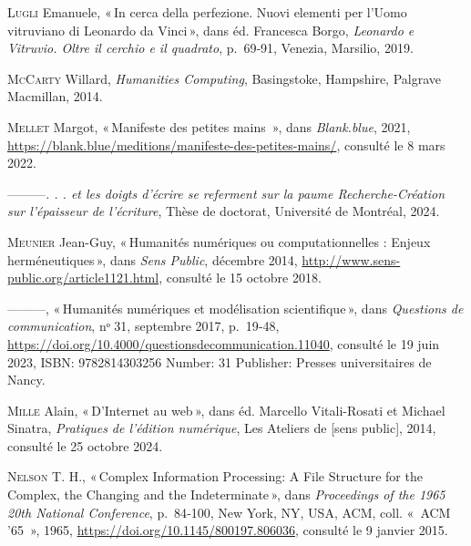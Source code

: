 \begin{CSLReferences}{1}{0}
\leavevmode{}%
\textsc{Lugli} Emanuele, {«\,In cerca della perfezione. {Nuovi} elementi
per l'{Uomo} vitruviano di {Leonardo} da {Vinci}\,»}, dans éd. Francesca
Borgo, \emph{Leonardo e {Vitruvio}. {Oltre} il cerchio e il quadrato},
p.~69‑91, Venezia, Marsilio, 2019.

\leavevmode{}%
\textsc{McCarty} Willard, \emph{Humanities {Computing}}, Basingstoke,
Hampshire, Palgrave Macmillan, 2014.

\leavevmode{}%
\textsc{Mellet} Margot, {«\,Manifeste des petites mains {\textbar}\,»},
dans \emph{Blank.blue}, 2021,
\url{https://blank.blue/meditions/manifeste-des-petites-mains/},
consulté le 8 mars 2022.

\leavevmode{}%
---------\emph{. . . et les doigts d'écrire se referment sur la paume
{Recherche}-{Création} sur l'épaisseur de l'écriture}, Thèse de
doctorat, Université de Montréal, 2024.

\leavevmode{}%
\textsc{Meunier} Jean-Guy, {«\,Humanités numériques ou computationnelles
: {Enjeux} herméneutiques\,»}, dans \emph{Sens Public}, décembre 2014,
\url{http://www.sens-public.org/article1121.html}, consulté le 15
octobre 2018.

\leavevmode{}%
---------, {«\,Humanités numériques et modélisation scientifique\,»},
dans \emph{Questions de communication}, nᵒ 31, septembre 2017, p.~19‑48,
\url{https://doi.org/10.4000/questionsdecommunication.11040}, consulté
le 19 juin 2023, ISBN: 9782814303256 Number: 31 Publisher: Presses
universitaires de Nancy.

\leavevmode{}%
\textsc{Mille} Alain, {«\,D'{Internet} au web\,»}, dans éd. Marcello
Vitali-Rosati et Michael Sinatra, \emph{Pratiques de l'édition
numérique}, Les Ateliers de {[}sens public{]}, 2014, consulté le 25
octobre 2024.

\leavevmode{}%
\textsc{Nelson} T. H., {«\,Complex {Information} {Processing}: {A}
{File} {Structure} for the {Complex}, the {Changing} and the
{Indeterminate}\,»}, dans \emph{Proceedings of the 1965 20th {National}
{Conference}}, p.~84‑100, New York, NY, USA, ACM, coll. «~{ACM} '65~»,
1965, \url{https://doi.org/10.1145/800197.806036}, consulté le 9 janvier
2015.


\end{CSLReferences}
